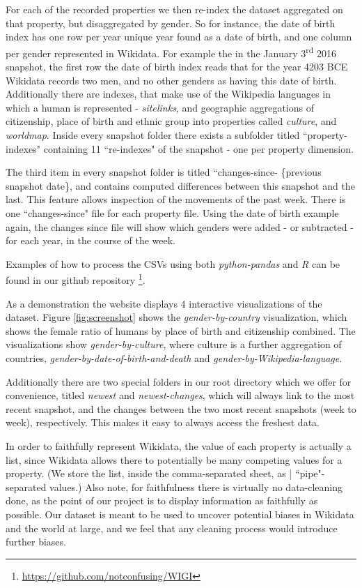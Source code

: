 \documentclass[letterpaper]{article}
\begin{document}
For each of the recorded properties we then re-index the dataset aggregated on that property, but disaggregated by gender. So for instance, the date of birth index has one row per year unique year found as a date of birth, and one column per gender represented in Wikidata. For example the in the January 3\textsuperscript{rd} 2016 snapshot, the first row the date of birth index reads that for the year 4203 BCE Wikidata records two men, and no other genders as having this date of birth. Additionally there are indexes, that make use of the Wikipedia languages in which a human is represented - \textit{sitelinks}, and geographic aggregations of citizenship, place of birth and ethnic group into properties called \textit{culture}, and \textit{worldmap}. Inside every snapshot folder there exists a subfolder titled ``property-indexes" containing 11 ``re-indexes" of the snapshot - one per property dimension.
 
 The third item in every snapshot folder is titled ``changes-since- \{previous snapshot date\}, and contains computed differences between this snapshot and the last. This feature allows inspection of the movements of the past week. There is one ``changes-since" file for each property file. Using the date of birth example again, the changes since file will show which genders were added - or subtracted - for each year, in the course of the week.

Examples of how to process the CSVs using both \textit{python-pandas} and \textit{R} can be found in our github repository \footnote{\url{https://github.com/notconfusing/WIGI}}. 

As a demonstration the website displays 4 interactive visualizations of the dataset. Figure \ref{fig:screenshot} shows the \textit{gender-by-country} visualization, which shows the female ratio of humans by place of birth and citizenship combined. The visualizations show \textit{gender-by-culture}, where culture is a further aggregation of countries, \textit{gender-by-date-of-birth-and-death} and \textit{gender-by-Wikipedia-language}.

Additionally there are two special folders in our root directory which we offer for convenience,  titled \textit{newest} and \textit{newest-changes}, which will always link to the most recent snapshot, and the changes between the two most recent snapshots (week to week), respectively. This makes it easy to always access the freshest data.

In order to faithfully represent Wikidata, the value of each property is actually a list, since Wikidata allows there to potentially be many competing values for a property. (We store the list, inside the comma-separated sheet, as | ``pipe"-separated values.)  Also note, for faithfulness there is virtually no data-cleaning done, as the point of our project is to display information as faithfully as possible. Our dataset is meant to be used to uncover potential biases in Wikidata and the world at large, and we feel that any cleaning process would introduce further biases.
\end{document}
